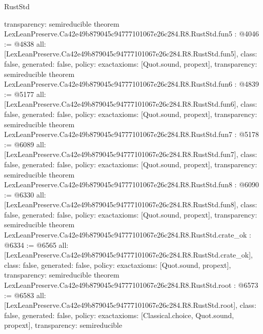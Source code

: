 \begin{lexlean}{RustStd}
\begin{coremodule}
{  transparency: semireducible
}
theorem LexLeanPreserve.Ca42e49b879045c94777101067e26c284.R8.RustStd.fun5 : @4046 := @4838 {
  all: [LexLeanPreserve.Ca42e49b879045c94777101067e26c284.R8.RustStd.fun5],
  class: false,
  generated: false,
  policy: exact{axioms: [Quot.sound, propext]},
  transparency: semireducible
}
theorem LexLeanPreserve.Ca42e49b879045c94777101067e26c284.R8.RustStd.fun6 : @4839 := @5177 {
  all: [LexLeanPreserve.Ca42e49b879045c94777101067e26c284.R8.RustStd.fun6],
  class: false,
  generated: false,
  policy: exact{axioms: [Quot.sound, propext]},
  transparency: semireducible
}
theorem LexLeanPreserve.Ca42e49b879045c94777101067e26c284.R8.RustStd.fun7 : @5178 := @6089 {
  all: [LexLeanPreserve.Ca42e49b879045c94777101067e26c284.R8.RustStd.fun7],
  class: false,
  generated: false,
  policy: exact{axioms: [Quot.sound, propext]},
  transparency: semireducible
}
theorem LexLeanPreserve.Ca42e49b879045c94777101067e26c284.R8.RustStd.fun8 : @6090 := @6330 {
  all: [LexLeanPreserve.Ca42e49b879045c94777101067e26c284.R8.RustStd.fun8],
  class: false,
  generated: false,
  policy: exact{axioms: [Quot.sound, propext]},
  transparency: semireducible
}
theorem LexLeanPreserve.Ca42e49b879045c94777101067e26c284.R8.RustStd.crate_ok : @6334 := @6565 {
  all: [LexLeanPreserve.Ca42e49b879045c94777101067e26c284.R8.RustStd.crate_ok],
  class: false,
  generated: false,
  policy: exact{axioms: [Quot.sound, propext]},
  transparency: semireducible
}
theorem LexLeanPreserve.Ca42e49b879045c94777101067e26c284.R8.RustStd.root : @6573 := @6583 {
  all: [LexLeanPreserve.Ca42e49b879045c94777101067e26c284.R8.RustStd.root],
  class: false,
  generated: false,
  policy: exact{axioms: [Classical.choice, Quot.sound, propext]},
  transparency: semireducible
}


\end{coremodule}
\end{lexlean}

